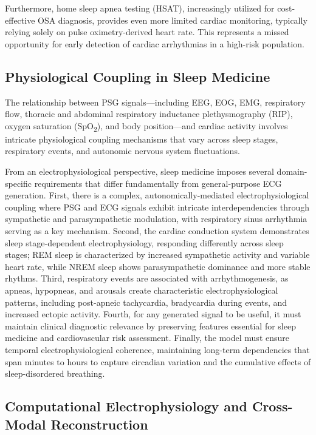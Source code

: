 \documentclass[11pt,en]{elegantpaper}
\begin{document}
Furthermore, home sleep apnea testing (HSAT), increasingly utilized for cost-effective OSA diagnosis, provides even more limited cardiac monitoring, typically relying solely on pulse oximetry-derived heart rate. This represents a missed opportunity for early detection of cardiac arrhythmias in a high-risk population.

\subsection{Physiological Coupling in Sleep Medicine}

The relationship between PSG signals—including EEG, EOG, EMG, respiratory flow, thoracic and abdominal respiratory inductance plethysmography (RIP), oxygen saturation (SpO\textsubscript{2}), and body position—and cardiac activity involves intricate physiological coupling mechanisms that vary across sleep stages, respiratory events, and autonomic nervous system fluctuations.

From an electrophysiological perspective, sleep medicine imposes several domain-specific requirements that differ fundamentally from general-purpose ECG generation. First, there is a complex, autonomically-mediated electrophysiological coupling where PSG and ECG signals exhibit intricate interdependencies through sympathetic and parasympathetic modulation, with respiratory sinus arrhythmia serving as a key mechanism. Second, the cardiac conduction system demonstrates sleep stage-dependent electrophysiology, responding differently across sleep stages; REM sleep is characterized by increased sympathetic activity and variable heart rate, while NREM sleep shows parasympathetic dominance and more stable rhythms. Third, respiratory events are associated with arrhythmogenesis, as apneas, hypopneas, and arousals create characteristic electrophysiological patterns, including post-apneic tachycardia, bradycardia during events, and increased ectopic activity. Fourth, for any generated signal to be useful, it must maintain clinical diagnostic relevance by preserving features essential for sleep medicine and cardiovascular risk assessment. Finally, the model must ensure temporal electrophysiological coherence, maintaining long-term dependencies that span minutes to hours to capture circadian variation and the cumulative effects of sleep-disordered breathing.

\subsection{Computational Electrophysiology and Cross-Modal Reconstruction}
\end{document}
